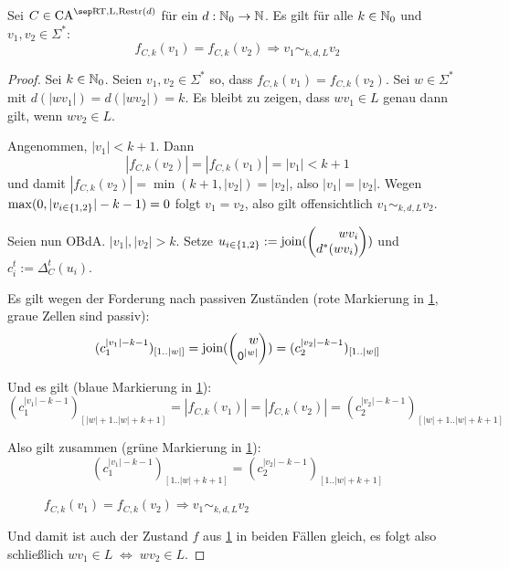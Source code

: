 \begin{satz}
    \label{satzFEqualsImpliesEquiv}
    Sei $C \in \CAM{\CART, \CALeft, \CARestr(d)}$ für ein $d: \mathbb{N}_0 \to \mathbb{N}$. Es gilt für alle $k \in \mathbb{N}_0$ und $v_1, v_2 \in \Sigma^*$:
    \[
        f_{C, k}(v_1) = f_{C, k}(v_2) \Rightarrow v_1 \sim_{k,d,L} v_2
    \]
\end{satz}
\begin{proof}
    Sei $k \in \mathbb{N}_0$. Seien $v_1, v_2 \in \Sigma^*$ so, dass $f_{C, k}(v_1) = f_{C, k}(v_2)$.
    Sei $w \in \Sigma^*$ mit $d(|wv_1|) = d(|wv_2|) = k$.
    Es bleibt zu zeigen, dass $wv_1 \in L$ genau dann gilt, wenn $wv_2 \in L$.
    
    Angenommen, $|v_1| < k + 1$. Dann 
    \[
        |f_{C, k}(v_2)| = |f_{C, k}(v_1)| = |v_1| < k + 1
    \]
    und damit $|f_{C, k}(v_2)| = \min(k+1, |v_2|) = |v_2|$, also $|v_1| = |v_2|$.
    Wegen $\max(0, |v_{i \in \{ {1,2} \}}|-k-1) = 0$ folgt $v_1 = v_2$, also gilt offensichtlich $v_1 \sim_{k,d,L} v_2$.
    
    Seien nun \acs{OBdA.} $|v_1|, |v_2| > k$.
    Setze $u_{i \in \finset{1, 2}} := \joinw(\Spvek{ wv_i; d^*(wv_i) })$
    und $c^t_i := \Delta_C^{t}( u_i )$.
    
    Es gilt wegen der Forderung nach passiven Zuständen (rote Markierung in \cref{fig:RestrAutomata_fCk_Equiv}, graue Zellen sind passiv): 
    \[(c_1^{|v_1|-k-1})_{[1..|w|]} = \joinw(\Spvek{ w; \chr{0}^{|w|} }) = (c_2^{|v_2|-k-1})_{[1..|w|]}\]
    
    Und es gilt (blaue Markierung in \cref{fig:RestrAutomata_fCk_Equiv}): 
    \[(c_1^{|v_1|-k-1})_{[|w|+1..|w|+k+1]} = |f_{C, k}(v_1)| = |f_{C, k}(v_2)| = (c_2^{|v_2|-k-1})_{[|w|+1..|w|+k+1]}\]
    
    
    Also gilt zusammen (grüne Markierung in \cref{fig:RestrAutomata_fCk_Equiv}): 
    \[(c_1^{|v_1|-k-1})_{[1..|w|+k+1]} = (c_2^{|v_2|-k-1})_{[1..|w|+k+1]}\]
    
    \begin{figure}[h!]
        \centering
        
        \caption{$f_{C,k}(v_1) = f_{C,k}(v_2) \Rightarrow v_1 \sim_{k,d,L} v_2$}
        \label{fig:RestrAutomata_fCk_Equiv}
    \end{figure}
    
    Und damit ist auch der Zustand $f$ aus \cref{fig:RestrAutomata_fCk_Equiv} in beiden Fällen gleich,
    es folgt also schließlich $wv_1 \in L \; \Leftrightarrow \; wv_2 \in L$.
\end{proof}


